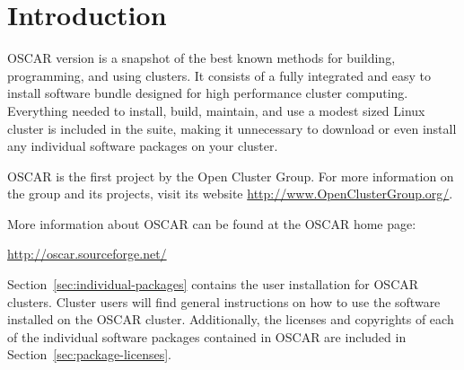 %
%
%

\section{Introduction}

OSCAR version \oscarversion is a snapshot of the best known methods
for building, programming, and using clusters. It consists of a fully
integrated and easy to install software bundle designed for high
performance cluster computing. Everything needed to install, build,
maintain, and use a modest sized Linux cluster is included in the
suite, making it unnecessary to download or even install any
individual software packages on your cluster.

OSCAR is the first project by the Open Cluster Group. For more
information on the group and its projects, visit its website
\url{http://www.OpenClusterGroup.org/}.

More information about OSCAR can be found at the OSCAR home page:

\vspace{10pt}
\centerline{\url{http://oscar.sourceforge.net/}}
\vspace{10pt}

Section~\ref{sec:individual-packages} contains the user installation
for OSCAR clusters.  Cluster users will find general instructions on
how to use the software installed on the OSCAR cluster.  Additionally,
the licenses and copyrights of each of the individual software
packages contained in OSCAR are included in
Section~\ref{sec:package-licenses}.

